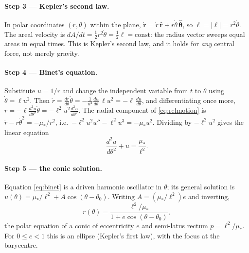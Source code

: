 \documentclass[11pt]{article}
\theoremstyle{definition}
\begin{document}
\paragraph{Step 3 --- Kepler's second law.}
In polar coordinates $(r,\theta)$ within the plane, $\dot{\mathbf r} =
\dot r\,\hat{\mathbf r} + r\dot\theta\,\hat{\boldsymbol\theta}$, so
$\ell = |\boldsymbol\ell| = r^2\dot\theta$. The areal velocity is
$dA/dt = \tfrac12 r^2\dot\theta = \tfrac12 \ell = \text{const}$: the radius
vector sweeps equal areas in equal times. This is Kepler's second law, and it
holds for \emph{any} central force, not merely gravity.

\paragraph{Step 4 --- Binet's equation.}
Substitute $u = 1/r$ and change the independent variable from $t$ to $\theta$
using $\dot\theta = \ell u^2$. Then
$\dot r = \frac{dr}{d\theta}\dot\theta = -\frac{1}{u^2}\frac{du}{d\theta}\,\ell u^2 = -\ell\,\frac{du}{d\theta}$,
and differentiating once more,
$\ddot r = -\ell\frac{d^2u}{d\theta^2}\dot\theta = -\ell^2 u^2 \frac{d^2u}{d\theta^2}$.
The radial component of \eqref{eq:relmotion} is
$\ddot r - r\dot\theta^2 = -\mu_{\!*}/r^2$, i.e.\
$-\ell^2u^2 u'' - \ell^2 u^3 = -\mu_{\!*}u^2$. Dividing by $-\ell^2u^2$ gives
the linear equation
\begin{equation}
\frac{d^2u}{d\theta^2} + u = \frac{\mu_{\!*}}{\ell^2}.
\label{eq:binet}
\end{equation}

\paragraph{Step 5 --- the conic solution.}
Equation \eqref{eq:binet} is a driven harmonic oscillator in $\theta$; its
general solution is $u(\theta) = \mu_{\!*}/\ell^2 + A\cos(\theta-\theta_0)$.
Writing $A = (\mu_{\!*}/\ell^2)e$ and inverting,
\begin{equation}
r(\theta) = \frac{\ell^2/\mu_{\!*}}{1 + e\cos(\theta-\theta_0)},
\label{eq:conic}
\end{equation}
the polar equation of a conic of eccentricity $e$ and semi-latus rectum
$p = \ell^2/\mu_{\!*}$. For $0 \le e < 1$ this is an ellipse (Kepler's first law),
with the focus at the barycentre.
\end{document}
